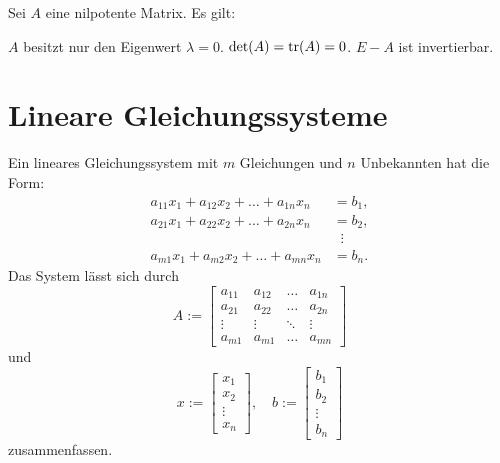 \noindent
{}
Sei $A$ eine nilpotente Matrix. Es gilt:
\begin{itemize}[itemsep=0pt, leftmargin=3em]
\bitem $A$ besitzt nur den Eigenwert $\lambda=0$.
\bitem $\det(A)=\operatorname{tr}(A)=0$.
\bitem $E-A$ ist invertierbar.
\end{itemize}

\section{Lineare Gleichungssysteme}
Ein lineares Gleichungssystem mit $m$ Gleichungen und $n$ Unbekannten
hat die Form:
\begin{equation}\label{eq:LGS}
\begin{split}
a_{11} x_1 + a_{12} x_2 + \ldots + a_{1n} x_n &= b_1,\\
a_{21} x_1 + a_{22} x_2 + \ldots + a_{2n} x_n &= b_2,\\
&\;\;\vdots\\
a_{m1} x_1 + a_{m2} x_2 + \ldots + a_{mn} x_n &= b_n.
\end{split}
\end{equation}
Das System lässt sich durch
\begin{equation}
A:=\begin{bmatrix}
a_{11} & a_{12} & \ldots & a_{1n}\\
a_{21} & a_{22} & \ldots & a_{2n}\\
\vdots & \vdots & \ddots & \vdots\\
a_{m1} & a_{m1} & \ldots & a_{mn}
\end{bmatrix}
\end{equation}
und
\begin{equation}
x:=\begin{bmatrix}
x_1 \\ x_2 \\ \vdots \\ x_n
\end{bmatrix},\quad
b:=\begin{bmatrix}
b_1 \\ b_2 \\ \vdots \\ b_n
\end{bmatrix}
\end{equation}
zusammenfassen.


